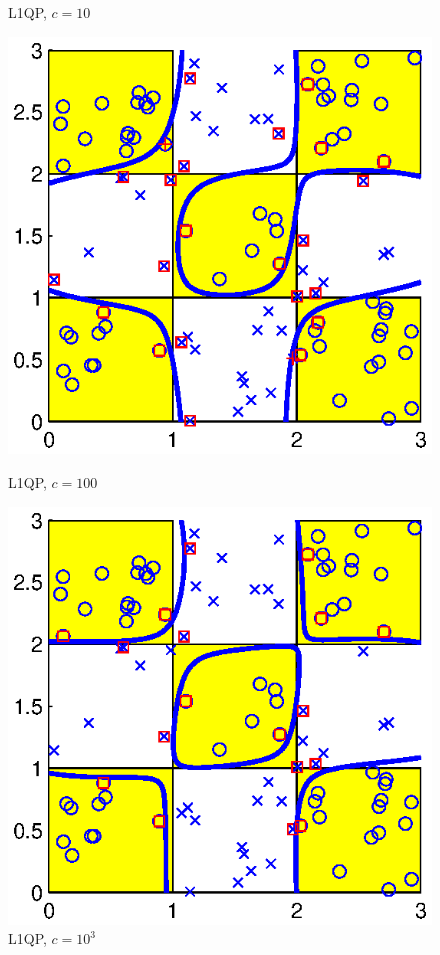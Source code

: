 \documentclass[11pt,a4paper]{article}
\theoremstyle{definition}
\begin{document}
\begin{figure}[htbp]
\begin{minipage}[t]{0.24\linewidth}
          \caption{\label{Fig:ex3_2}L1QP, $c=10$}
        \end{minipage}
        \begin{minipage}[t]{0.24\linewidth}
          \centering
          \includegraphics[width=1\textwidth]{2_3x3_l1qp_100.eps}
          \caption{\label{Fig:ex3_3}L1QP, $c=100$}
        \end{minipage}
        \begin{minipage}[t]{0.24\linewidth}
          \centering
          \includegraphics[width=1\textwidth]{2_3x3_l1qp_1000.eps}
          \caption{\label{Fig:ex3_4}L1QP, $c=10^{3}$}
        \end{minipage}
      \end{figure}
\end{document}
